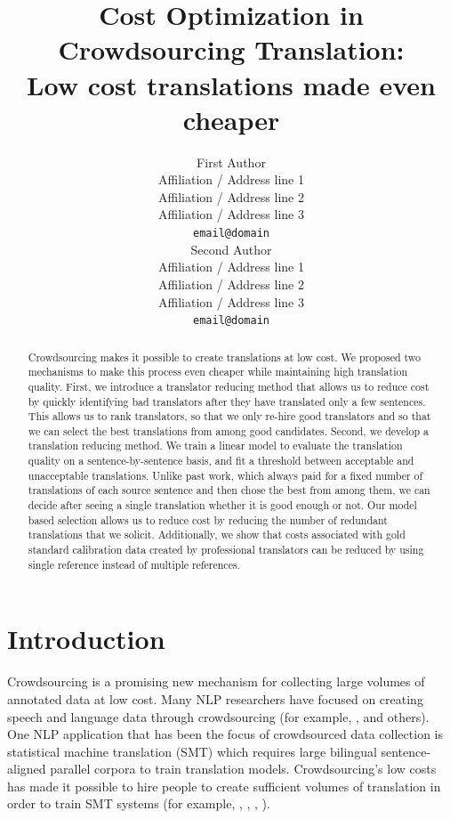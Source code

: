 \documentclass[11pt,letterpaper]{article}
\title{Cost Optimization in Crowdsourcing Translation:\\ Low cost translations made even cheaper}
\author{First Author \\
  Affiliation / Address line 1 \\
  Affiliation / Address line 2 \\
  Affiliation / Address line 3 \\
  {\tt email@domain} \\\And
  Second Author \\
  Affiliation / Address line 1 \\
  Affiliation / Address line 2 \\
  Affiliation / Address line 3 \\
  {\tt email@domain} \\}
\date{}
\begin{document}
\maketitle
\begin{abstract}
Crowdsourcing makes it possible to create translations at low cost. We proposed two mechanisms to make this process even cheaper while maintaining high translation quality.
First, we introduce a translator reducing method that allows us to reduce cost by quickly identifying bad translators after they have translated only a few sentences.  This allows us to rank translators, so that we only re-hire good translators and so that we can select the best translations from among good candidates. Second, we develop a translation reducing method.  We train a linear model to evaluate the translation quality on a sentence-by-sentence basis, and fit a threshold between acceptable and unacceptable translations.   Unlike past work, which always paid for a fixed number of translations of each source sentence and then chose the best from among them, we can decide after seeing a single translation whether it is good enough or not. Our model based selection allows us to reduce cost by reducing the number of redundant translations that we solicit. 
Additionally, we show that costs associated with gold standard calibration data created by professional translators can be reduced by using single reference instead of multiple references. 
 \end{abstract}

\section{Introduction}

Crowdsourcing is a promising new mechanism for collecting large volumes of annotated data at low cost.  %
Many NLP researchers have focused on creating speech and language data through crowdsourcing (for example,  ,  and others).  One NLP application that has been the focus of crowdsourced data collection is statistical machine translation (SMT) which requires large bilingual sentence-aligned parallel corpora to train translation models.  Crowdsourcing's low costs has made it possible to hire people to create sufficient volumes of translation in order to train SMT systems (for example,   ,  ,  , ).
\end{document}
